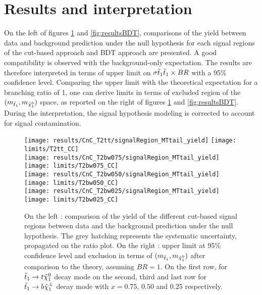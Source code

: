     \section{Results and interpretation \label{sec:analysis_results}}

    On the left of figures \ref{fig:resultsCnC} and \ref{fig:resultsBDT}, comparisons
    of the yield between data and background prediction under the null hypothesis
    for each signal regions of the cut-based approach and BDT approach are presented.
    A good compatibility is observed with the background-only expectation. The results
    are therefore interpreted in terms of upper limit on $\sigma{\tilde{t}_1\tilde{t}_1} \times BR$
    with a 95\% confidence level.  Comparing the upper limit with the theoretical
    expectation for a branching ratio of 1, one can derive limits in terms of excluded
    region of the $(m_{\tilde{t}_1}, m_{\tilde{\chi}_1^0})$ space, as reported on the right
    of figures \ref{fig:resultsCnC} and \ref{fig:resultsBDT}. During the interpretation,
    the signal hypothesis modeling is corrected to account for signal contamination.

    \begin{figure}[h!]
        \centering
        \texttt{[image: results/CnC\_T2tt/signalRegion\_MTtail\_yield]}
        \texttt{[image: limits/T2tt\_CC]}\\
        \texttt{[image: results/CnC\_T2bw075/signalRegion\_MTtail\_yield]}
        \texttt{[image: limits/T2bw075\_CC]}\\
        \texttt{[image: results/CnC\_T2bw050/signalRegion\_MTtail\_yield]}
        \texttt{[image: limits/T2bw050\_CC]}\\
        \texttt{[image: results/CnC\_T2bw025/signalRegion\_MTtail\_yield]}
        \texttt{[image: limits/T2bw025\_CC]}\\
        \caption{On the left : comparison of the yield of the different cut-based signal
        regions between data and the background prediction under the null hypothesis. The
        grey hatching represents the systematic uncertainty, propagated on the ratio plot.
        On the right : upper limit at 95\% confidence level and exclusion in terms of
        $(m_{\tilde{t}_1},m_{\tilde{\chi}_1^0})$ after comparison to the theory, assuming
        $BR = 1$. On the first row, for $\tilde{t}_1 \rightarrow t \tilde{\chi}_1^0$ decay mode on
        the second, third and last row for $\tilde{t}_1 \rightarrow b \tilde{\chi}_1^\pm$ decay mode
        with $x=0.75$, $0.50$ and $0.25$ respectively.}
        \label{fig:resultsCnC}
    \end{figure}

